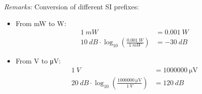 \begin{solution}
\begin{tasks}
		\textit{Remarks:} Conversion of different SI prefixes:
		\begin{itemize}
			\item From \si{mW} to \si{W}:
			\begin{equation*}
				\begin{split}
					\SI{1}{mW} &= \SI{0.001}{W} \\
					\SI{10}{dB} \cdot \log_{10}\left(\frac{\SI{0.001}{W}}{\SI{1}{mW}}\right) &= \SI{-30}{dB}
				\end{split}
			\end{equation*}
			\item From \si{V} to \si{\micro\volt}:
			\begin{equation*}
				\begin{split}
					\SI{1}{V} &= \SI{1000000}{\micro\volt} \\
					\SI{20}{dB} \cdot \log_{10}\left(\frac{\SI{1000000}{\micro\volt}}{\SI{1}{V}}\right) &= \SI{120}{dB}
				\end{split}
			\end{equation*}
		\end{itemize}
	\end{tasks}
\end{solution}

